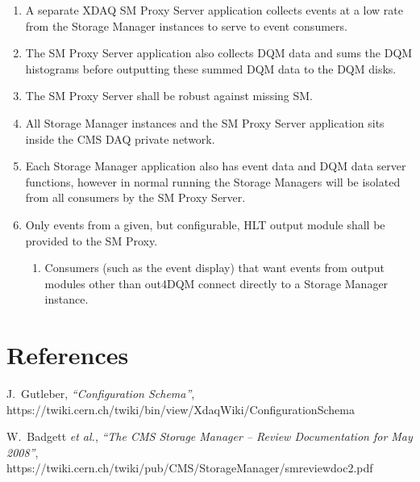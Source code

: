 \documentclass[]{article}
\begin{document}
\begin{enumerate}

\item A separate XDAQ SM Proxy Server application collects events at a low rate from the 
Storage Manager instances to serve to event consumers.

\item The SM Proxy Server application also collects DQM data and sums the DQM histograms before outputting these summed DQM data to the DQM disks.

\item The SM Proxy Server shall be robust against missing SM.

\item All Storage Manager instances and the SM Proxy Server application sits inside the CMS DAQ private network.

\item Each Storage Manager application also has event data and DQM data server functions, however in normal running the Storage Managers will be isolated from all consumers by the SM Proxy Server. 

\item Only events from a given, but configurable, HLT output module shall be provided to the SM Proxy.
\begin{enumerate}
\item Consumers (such as the event display) that want events from output modules other than out4DQM connect directly to a Storage Manager instance.
\end{enumerate}

\end{enumerate}



\section*{References}

\begin{thebibliography}{99}

J.~Gutleber, {\it ``Configuration Schema''},\\
{https://twiki.cern.ch/twiki/bin/view/XdaqWiki/ConfigurationSchema}

W.~Badgett {\it et al.}, 
{\it ``The CMS Storage Manager -- Review Documentation for May 2008''},\\
{https://twiki.cern.ch/twiki/pub/CMS/StorageManager/smreviewdoc2.pdf}

\end{thebibliography} 
\end{document}
